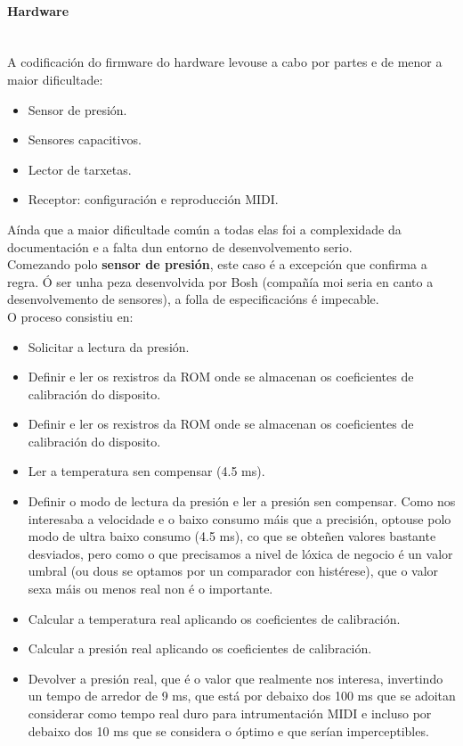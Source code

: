    \paragraph{Hardware}\mbox{}\\
   
   A codificación do firmware do hardware levouse a cabo por partes e de menor
   a maior dificultade:
   
   \begin{itemize}
    \item Sensor de presión.
    \item Sensores capacitivos.
    \item Lector de tarxetas.
    \item Receptor: configuración e reproducción MIDI.
   \end{itemize}
   
   Aínda que a maior dificultade común a todas elas foi a complexidade da
   documentación e a falta dun entorno de desenvolvemento serio. \\
   
   Comezando polo \textbf{sensor de presión}, este caso é a excepción que 
   confirma a regra. Ó ser unha peza desenvolvida por Bosh (compañía moi seria
   en canto a desenvolvemento de sensores), a folla de especificacións
   \cite{BMP085} é impecable. \\
   
    O proceso consistiu en:
    
    \begin{itemize}
    \item Solicitar a lectura da presión.
    \item Definir e ler os rexistros da ROM onde se almacenan os coeficientes de
        calibración do disposito.
    \item Definir e ler os rexistros da ROM onde se almacenan os coeficientes de
        calibración do disposito.
    \item Ler a temperatura sen compensar (4.5 ms).
    \item Definir o modo de lectura da presión e ler a presión sen compensar.
        Como nos interesaba a velocidade e o baixo consumo máis que a precisión,
        optouse polo modo de ultra baixo consumo (4.5 ms), co que se obteñen
        valores bastante desviados, pero como o que precisamos a nivel de lóxica
        de negocio é un valor umbral (ou dous se optamos por un comparador con
        histérese), que o valor sexa máis ou menos real non é o importante.
    \item Calcular a temperatura real aplicando os coeficientes de calibración.
    \item Calcular a presión real aplicando os coeficientes de calibración.
    \item Devolver a presión real, que é o valor que realmente nos interesa,
        invertindo un tempo de arredor de 9 ms, que está por debaixo dos 100 ms
        que se adoitan considerar como tempo real duro para intrumentación MIDI
        e incluso por debaixo dos 10 ms que se considera o óptimo e que serían
        imperceptibles.
   \end{itemize}
   
